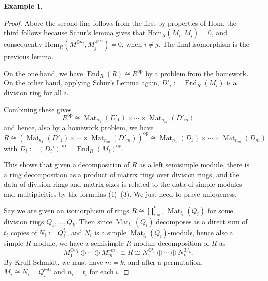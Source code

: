 \documentclass{amsart}[12pt]
\def\End{\operatorname{End}}
\def\Mat{\operatorname{Mat}}
\newcommand{\Hom}{\mathrm{Hom}}
\newcommand{\op}{\mathrm{op}}
\numberwithin{equation}{section}
\theoremstyle{plain} %
\theoremstyle{definition}
\newtheorem{ex}[equation]{Example}
\theoremstyle{remark}
\begin{document}
\begin{ex}
\begin{proof}
Above the second line follows from the first by properties of $\Hom$, the third follows because Schur's lemma gives that $\Hom_R(M_i,M_j)=0$, and consequently $\Hom_R(M_i^{\oplus n_i},M_j^{\oplus n_j})=0$, when $i\neq j$. The final isomorphism is the previous lemma.

  On the one hand, we have $\End_R(R) \cong R^{\op}$ by a problem from the homework.  On the other hand, applying Schur's Lemma again, $D'_i := \End_R(M_i)$ is a division ring for all $i$.


Combining these gives
$$
R^{\op} \cong \Mat_{n_1}(D'_1) \times \cdots \times \Mat_{n_m}(D'_m)
$$
and hence, also by a homework problem, we have
$$
R \cong
\left(\Mat_{n_1}(D'_1) \times \cdots \times \Mat_{n_m}(D'_m)\right)^{\op} \cong
\Mat_{n_1}(D_1) \times \cdots \times \Mat_{n_m}(D_m)
$$
with $D_i := (D_i')^{\op}=\End_R(M_i)^\op$.



This shows that given a decomposition of $R$ as a left semisimple module, there is a ring decomposition as a product of matrix rings over division rings, and the data of division rings and matrix sizes is related to the data of simple modules and multiplicities by the formulas (1)--(3). We just need to prove uniqueness. 

Say we are given an isomorphism of rings $R \cong \prod_{i=1}^k \Mat_{t_i}(Q_i)$ for some division rings $Q_1,\dots,Q_k$. Then since $\Mat_{t_i}(Q_i)$ decomposes as a direct sum of $t_i$ copies of $N_i:=Q_i^{t_i}$, and $N_i$ is a simple $\Mat_{t_i}(Q_i)$-module, hence also a simple $R$-module, we have a semisimple $R$-module decomposition of $R$ as
\[ M_1^{\oplus n_1} \oplus  \cdots \oplus M_m^{\oplus n_m} \cong R \cong N_1^{\oplus t_1} \oplus \cdots \oplus N_k^{\oplus t_k}.\]
By Krull-Schmidt, we must have $m=k$, and after a permutation, $M_i \cong N_i = Q_i^{\oplus t_i}$ and $n_i=t_i$ for each $i$.



\end{proof}
\end{ex}
\end{document}
